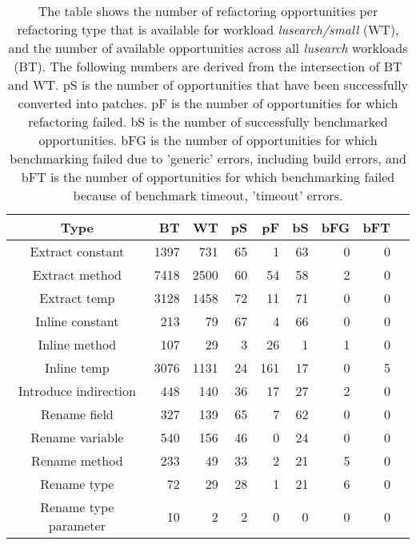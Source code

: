 \begin{table}[!h]
\caption{The table shows the number of refactoring opportunities per refactoring type that is available for workload \textit{lusearch/small} (WT), and the number of available opportunities across all \textit{lusearch} workloads (BT). The following numbers are derived from the intersection of BT and WT. pS is the number of opportunities that have been successfully converted into patches. pF is the number of opportunities for which refactoring failed. bS is the number of successfully benchmarked opportunities. bFG is the number of opportunities for which benchmarking failed due to 'generic' errors, including build errors, and bFT is the number of opportunities for which benchmarking failed because of benchmark timeout, 'timeout' errors.}
\begin{tabular}{c|*{7}{r}r}
Type&BT&WT&pS&pF&bS&bFG&bFT\\
\hline
Extract constant&1397&731&65&1&63&0&0\\
Extract method&7418&2500&60&54&58&2&0\\
Extract temp&3128&1458&72&11&71&0&0\\
Inline constant&213&79&67&4&66&0&0\\
Inline method&107&29&3&26&1&1&0\\
Inline temp&3076&1131&24&161&17&0&5\\
Introduce indirection&448&140&36&17&27&2&0\\
Rename field&327&139&65&7&62&0&0\\
Rename variable&540&156&46&0&24&0&0\\
Rename method&233&49&33&2&21&5&0\\
Rename type&72&29&28&1&21&6&0\\
Rename type parameter&10&2&2&0&0&0&0\\
\end{tabular}
\end{table}
